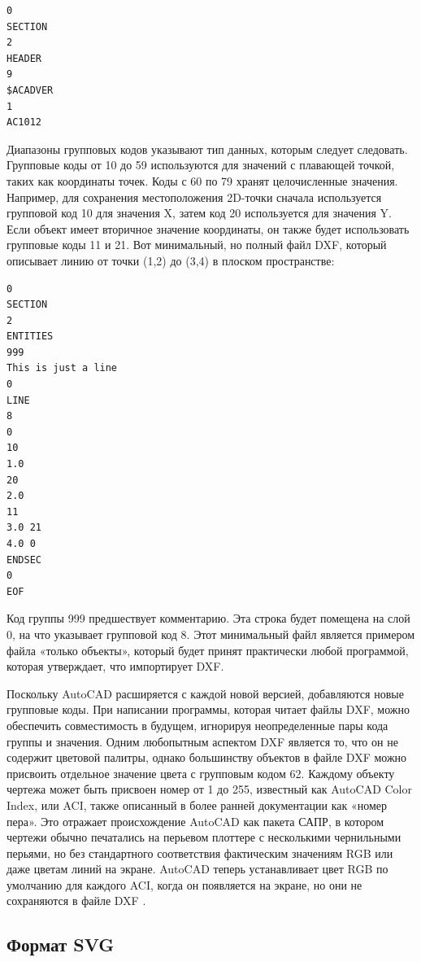 \begin{lstlisting}[label=list:dxfheader]
0
SECTION
2
HEADER
9
$ACADVER
1
AC1012
\end{lstlisting}

Диапазоны групповых кодов указывают тип данных, которым следует следовать. Групповые коды от 10 до 59 используются для значений с плавающей точкой, таких как координаты точек. Коды с 60 по 79 хранят целочисленные значения. Например, для сохранения местоположения 2D-точки сначала используется групповой код 10 для значения X, затем код 20 используется для значения Y. Если объект имеет вторичное значение координаты, он также будет использовать групповые коды 11 и 21. Вот минимальный, но полный файл DXF, который описывает линию от точки (1,2) до (3,4) в плоском пространстве:

\begin{lstlisting}[label=list:dxflinefull]
0
SECTION
2
ENTITIES
999
This is just a line
0
LINE
8
0
10
1.0
20
2.0
11
3.0 21
4.0 0
ENDSEC
0
EOF
\end{lstlisting}

Код группы 999 предшествует комментарию. Эта строка будет помещена на слой 0, на что указывает групповой код 8. Этот минимальный файл является примером файла «только объекты», который будет принят практически любой программой, которая утверждает, что импортирует DXF.

Поскольку AutoCAD расширяется с каждой новой версией, добавляются новые групповые коды. При написании программы, которая читает файлы DXF, можно обеспечить совместимость в будущем, игнорируя неопределенные пары кода группы и значения.
Одним любопытным аспектом DXF является то, что он не содержит цветовой палитры, однако большинству объектов в файле DXF можно присвоить отдельное значение цвета с групповым кодом 62. Каждому объекту чертежа может быть присвоен номер от 1 до 255, известный как AutoCAD Color Index, или ACI, также описанный в более ранней документации как «номер пера». Это отражает происхождение AutoCAD как пакета САПР, в котором чертежи обычно печатались на перьевом плоттере с несколькими чернильными перьями, но без стандартного соответствия фактическим значениям RGB или даже цветам линий на экране. AutoCAD теперь устанавливает цвет RGB по умолчанию для каждого ACI, когда он появляется на экране, но они не сохраняются в файле DXF \cite{murray1996encyclopedia}.

\subsection{Формат SVG}
